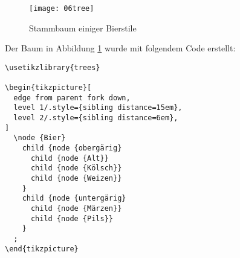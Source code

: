 \documentclass{scrartcl}
\begin{document}
\begin{figure}[]
	\centering
	\texttt{[image: 06tree]}
	\caption{Stammbaum einiger Bierstile}
	\label{fig:tree}
\end{figure}


\newsavebox{\SolutionCodeD}
\begin{lrbox}{\SolutionCodeD}
\begin{minipage}{\textwidth}
Der Baum in Abbildung \ref{fig:tree} wurde mit folgendem Code erstellt:
\begin{lstlisting}
\usetikzlibrary{trees}

\begin{tikzpicture}[
  edge from parent fork down,
  level 1/.style={sibling distance=15em},
  level 2/.style={sibling distance=6em},
]
  \node {Bier}
    child {node {obergärig}
      child {node {Alt}}
      child {node {Kölsch}}
      child {node {Weizen}}
    }
    child {node {untergärig}
      child {node {Märzen}}
      child {node {Pils}}
    }
  ;
\end{tikzpicture}
\end{lstlisting}
\end{minipage}
\end{lrbox}

\begin{solution}
\noindent\usebox\SolutionCodeD
\end{solution}
\end{document}

